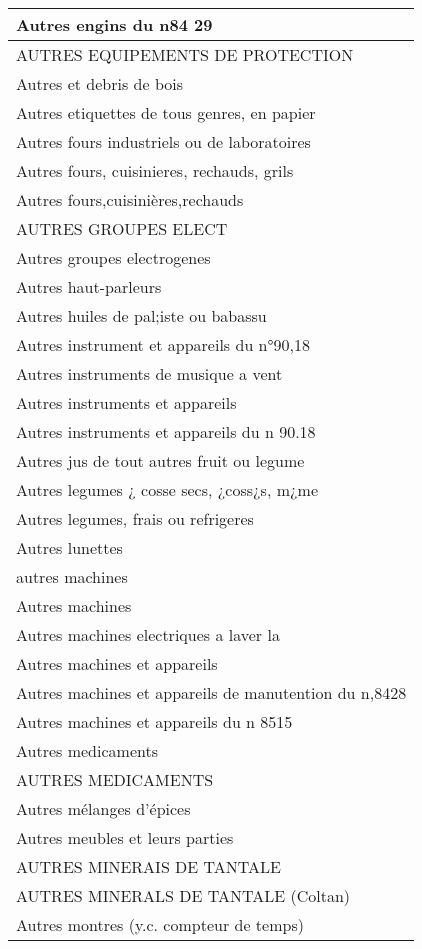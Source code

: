 \documentclass[
]{book}
\begin{document}
\begin{table}
\begin{tabular}[t]{l}
\hline
Autres engins du n84 29\\
\hline
AUTRES EQUIPEMENTS DE PROTECTION\\
\hline
Autres et debris de bois\\
\hline
Autres etiquettes de tous genres, en papier\\
\hline
Autres fours industriels ou de laboratoires\\
\hline
Autres fours, cuisinieres, rechauds, grils\\
\hline
Autres fours,cuisinières,rechauds\\
\hline
AUTRES GROUPES ELECT\\
\hline
Autres groupes electrogenes\\
\hline
Autres haut-parleurs\\
\hline
Autres huiles de pal;iste ou babassu\\
\hline
Autres instrument et appareils du n°90,18\\
\hline
Autres instruments de musique a vent\\
\hline
Autres instruments et appareils\\
\hline
Autres instruments et appareils du n 90.18\\
\hline
Autres jus de tout autres fruit ou legume\\
\hline
Autres legumes ¿ cosse secs, ¿coss¿s, m¿me\\
\hline
Autres legumes, frais ou refrigeres\\
\hline
Autres lunettes\\
\hline
autres machines\\
\hline
Autres machines\\
\hline
Autres machines electriques a laver la\\
\hline
Autres machines et appareils\\
\hline
Autres machines et appareils de manutention du n,8428\\
\hline
Autres machines et appareils du n 8515\\
\hline
Autres medicaments\\
\hline
AUTRES MEDICAMENTS\\
\hline
Autres mélanges d'épices\\
\hline
Autres meubles et leurs parties\\
\hline
AUTRES MINERAIS DE TANTALE\\
\hline
AUTRES MINERALS DE TANTALE (Coltan)\\
\hline
Autres montres (y.c. compteur de temps)\\

\end{tabular}
\end{table}
\end{document}
